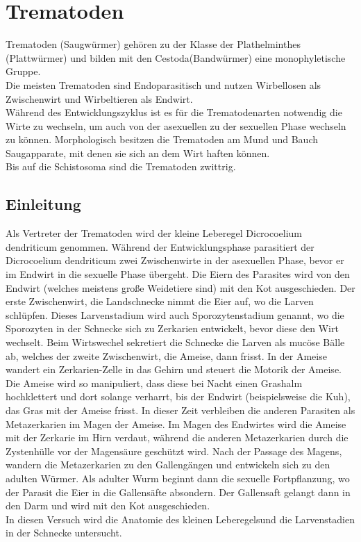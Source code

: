 \documentclass[oneside,10pt,a4paper]{report}
\begin{document}
	
	
	\chapter{Trematoden}
		Trematoden (Saugwürmer) gehören zu der Klasse der Plathelminthes (Plattwürmer) und bilden mit den Cestoda(Bandwürmer) eine monophyletische Gruppe.\\
		Die meisten Trematoden sind Endoparasitisch und nutzen Wirbellosen als Zwischenwirt und Wirbeltieren als Endwirt.\\
		Während des Entwicklungszyklus ist es für die Trematodenarten notwendig die Wirte zu wechseln, um auch von der asexuellen zu der sexuellen Phase wechseln zu können.
		Morphologisch besitzen die Trematoden am Mund und Bauch Saugapparate, mit denen sie sich an dem Wirt haften können. \\
		Bis auf die Schistosoma sind die Trematoden zwittrig.
		
		\section{Einleitung}
			Als Vertreter der Trematoden wird der kleine Leberegel Dicrocoelium dendriticum genommen.
			Während der Entwicklungsphase parasitiert der Dicrocoelium dendriticum zwei Zwischenwirte in der asexuellen Phase, bevor er im Endwirt in die sexuelle Phase übergeht.
			Die Eiern des Parasites wird von den Endwirt (welches meistens große Weidetiere sind) mit den Kot ausgeschieden. Der erste Zwischenwirt, die Landschnecke nimmt die Eier auf, wo die Larven schlüpfen. Dieses Larvenstadium wird auch Sporozytenstadium genannt, wo die Sporozyten in der Schnecke sich zu Zerkarien entwickelt, bevor diese den Wirt wechselt. Beim Wirtswechel sekretiert die Schnecke die Larven als mucöse Bälle ab, welches der zweite Zwischenwirt, die Ameise, dann frisst. In der Ameise wandert ein Zerkarien-Zelle in das Gehirn und steuert die Motorik der Ameise.
			Die Ameise wird so manipuliert, dass diese bei Nacht einen Grashalm hochklettert und dort solange verharrt, bis der Endwirt (beispielsweise die Kuh), das Gras mit der Ameise frisst.
			In dieser Zeit verbleiben die anderen Parasiten als Metazerkarien im Magen der Ameise.
			Im Magen des Endwirtes wird die Ameise mit der Zerkarie im Hirn verdaut, während die anderen Metazerkarien durch die Zystenhülle vor der Magensäure geschützt wird.
			Nach der Passage des Magens, wandern die Metazerkarien zu den Gallengängen und entwickeln sich zu den adulten Würmer.
			Als adulter Wurm beginnt dann die sexuelle Fortpflanzung, wo der Parasit die Eier in die Gallensäfte absondern. Der Gallensaft gelangt dann in den Darm und wird mit den Kot ausgeschieden.\\
			In diesen Versuch wird die Anatomie des kleinen Leberegelsund die Larvenstadien in der Schnecke untersucht.
			
\end{document}
